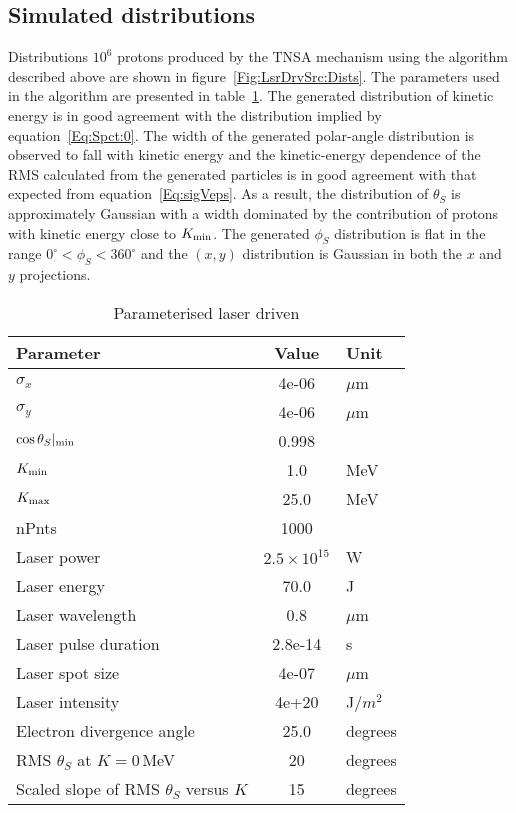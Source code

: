 \subsection{Simulated distributions}

Distributions $10^6$ protons produced by the TNSA mechanism using the
algorithm described above are shown in
figure~\ref{Fig:LsrDrvSrc:Dists}.
The parameters used in the algorithm are presented in
table~\ref{Tab:Src:Param}.
The generated distribution of kinetic energy is in good agreement with
the distribution implied by equation~\ref{Eq:Spct:0}.
The width of the generated polar-angle distribution is observed to
fall with kinetic energy and the kinetic-energy dependence of the RMS
calculated from the generated particles is in good agreement with that
expected from equation~\ref{Eq:sigVeps}.
As a result, the distribution of $\theta_S$ is approximately Gaussian
with a width dominated by the contribution of protons with kinetic
energy close to $K_{\rm min}$.
The generated $\phi_S$ distribution is flat in the range
$0^\circ < \phi_S < 360^\circ$ and the $(x, y)$ distribution is
Gaussian in both the $x$ and $y$ projections.
\begin{table}
  \caption{Parameterised laser driven}
  \label{Tab:Src:Param}
  \begin{center}
    \begin{tabular}{|l|c|l|}
      \hline
        \textbf{Parameter} & \textbf{Value} & \textbf{Unit} \\ 
        \hline
        $\sigma_x$&4e-06&$\mu$m \\ 
        $\sigma_y$&4e-06&$\mu$m \\ 
        $\cos\theta_S |_{\rm min}$&0.998& \\ 
        $K_{\rm min}$&1.0&MeV \\ 
        $K_{\rm max}$&25.0&MeV \\ 
        nPnts&1000& \\ 
        Laser power&$2.5\times10^{15}$&W \\ 
        Laser energy&70.0&J \\ 
        Laser wavelength&0.8&$\mu$m \\ 
        Laser pulse duration&2.8e-14&s \\ 
        Laser spot size&4e-07&$\mu$m \\ 
        Laser intensity&4e+20&J$/m^2$ \\ 
        Electron divergence angle&25.0&degrees \\
        RMS $\theta_S$ at $K=0$\,MeV & 20 & degrees \\
        Scaled slope of RMS $\theta_S$ versus $K$ & 15 & degrees \\
      \hline
    \end{tabular}
  \end{center}
\end{table}
